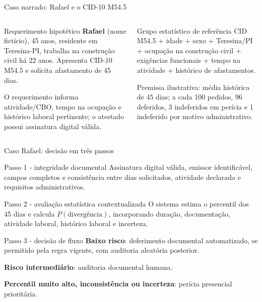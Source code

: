 \documentclass[presentation,aspectratio=169]{beamer}
\begin{document}
\begin{frame}[t]{Caso narrado: Rafael e o CID-10 M54.5}
\begin{columns}[T,onlytextwidth]
\begin{block}{Requerimento hipotético}\small
\textbf{Rafael} (nome fictício), 45 anos, residente em Teresina-PI, trabalha na construção civil há 22 anos. Apresenta CID-10 M54.5 e solicita afastamento de 45 dias.\par\vspace{0.30em}
O requerimento informa atividade/CBO, tempo na ocupação e histórico laboral pertinente; o atestado possui assinatura digital válida.
\end{block}
\begin{block}{Grupo estatístico de referência}\small
CID M54.5 + idade + sexo + Teresina/PI + ocupação na construção civil + exigências funcionais + tempo na atividade + histórico de afastamentos.\par\vspace{0.30em}
Premissa ilustrativa: média histórica de 45 dias; a cada 100 pedidos, 96 deferidos, 3 indeferidos em perícia e 1 indeferido por motivo administrativo.
\end{block}
\end{columns}
\vfill
{}
\end{frame}

\begin{frame}[t]{Caso Rafael: decisão em três passos}
\begin{block}{Passo 1 - integridade documental}\small
Assinatura digital válida, emissor identificável, campos completos e consistência entre dias solicitados, atividade declarada e requisitos administrativos.
\end{block}
\vspace{0.15cm}
\begin{block}{Passo 2 - avaliação estatística contextualizada}\small
O sistema estima o percentil dos 45 dias e calcula $P(\text{divergência})$, incorporando duração, documentação, atividade laboral, histórico laboral e incerteza.
\end{block}
\vspace{0.15cm}
\begin{block}{Passo 3 - decisão de fluxo}\small
\textbf{Baixo risco}: deferimento documental automatizado, se permitido pela regra vigente, com auditoria aleatória posterior.\par\vspace{0.25em}
\textbf{Risco intermediário}: auditoria documental humana.\par\vspace{0.25em}
\textbf{Percentil muito alto, inconsistência ou incerteza}: perícia presencial prioritária.
\end{block}
\end{frame}
\end{document}
